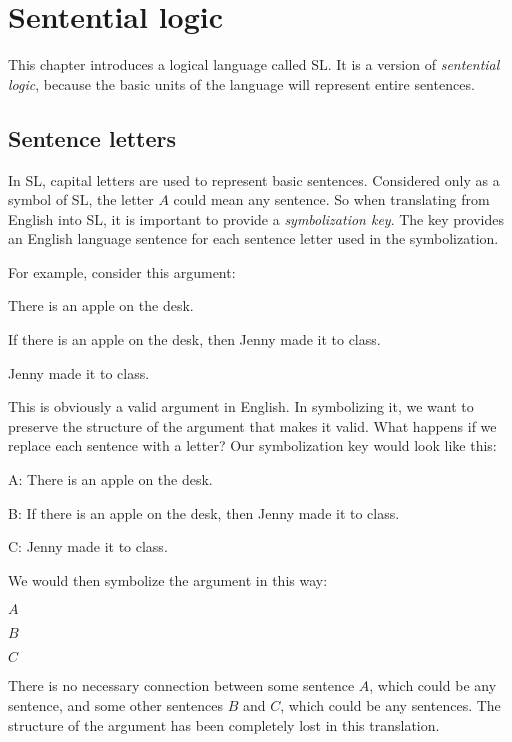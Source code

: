 \chapter{Sentential logic}
\label{ch.SL}




This chapter introduces a logical language called SL. It is a version of \emph{sentential logic}, because the basic units of the language will represent entire sentences.



\section{Sentence letters}
In SL, capital letters are used to represent basic sentences. Considered only as a symbol of SL, the letter $A$ could mean any sentence. So when translating from English into SL, it is important to provide a \emph{symbolization key}. The key provides an English language sentence for each sentence letter used in the symbolization.

For example, consider this argument:
\begin{earg}
\item[] There is an apple on the desk.
\item[] If there is an apple on the desk, then Jenny made it to class.
\item[\therefore] Jenny made it to class.
\end{earg}
This is obviously a valid argument in English. In symbolizing it, we want to preserve the structure of the argument that makes it valid.
What happens if we replace each sentence with a letter? Our symbolization key would look like this:
\begin{ekey}
\item[A:]There is an apple on the desk.
\item[B:]If there is an apple on the desk, then Jenny made it to class.
\item[C:]Jenny made it to class.
\end{ekey}
We would then symbolize the argument in this way:
\begin{earg}
\item[] $A$
\item[] $B$
\item[\therefore] $C$
\end{earg}
There is no necessary connection between some sentence $A$, which could be any sentence, and some other sentences $B$ and $C$, which could be any sentences.
The structure of the argument has been completely lost in this translation.

